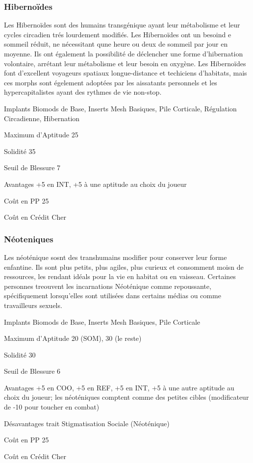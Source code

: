 \subsubsection{Hibernoïdes} \label{sec:starting-hibernoids} 

Les Hibernoïdes sont des humains transgénique ayant leur métabolisme et leur cycles circadien trés lourdement modifiés. Les Hibernoïdes ont un besoind e sommeil réduit, ne nécessitant qune heure ou deux de sommeil par jour en moyenne. Ils ont également la possibilité de déclencher une forme d'hibernation volontaire, arrétant leur métabolisme et leur besoin en oxygène. Les Hibernoïdes font d'excellent voyageurs spatiaux longue-distance et techiciens d'habitats, mais ces morphs sont égelement adoptées par les aissatants personnels et les hypercapitalistes ayant des rythmes de vie non-stop. 

\begin{description*} \item[Implants] Biomods de Base, Inserts Mesh Basiques, Pile Corticale, Régulation Circadienne, Hibernation\item[Maximum d'Aptitude] 25 \item[Solidité] 35 \item[Seuil de Blessure] 7 \item[Avantages] +5 en INT, +5 à une aptitude au choix du joueur\item[Coût en PP] 25 \item[Coût en Crédit] Cher \end{description*} 

\subsubsection{Néoteniques} \label{sec:starting-neonetics} 

Les néoténique sosnt des transhumains modifier pour conserver leur forme enfantine. Ils sont plus petits, plus agiles, plus curieux et consomment moisn de ressources, les rendant idéals pour la vie en habitat ou en vaisseau. Certaines personnes treouvent les incarnations Néoténique comme repoussante, spécifiquement lorsqu'elles sont utilisées dans certains médias ou comme travailleurs sexuels. 

\begin{description*} \item[Implants] Biomods de Base, Inserts Mesh Basiques, Pile Corticale\item[Maximum d'Aptitude] 20 (SOM), 30 (le reste) \item[Solidité] 30 \item[Seuil de Blessure] 6 \item[Avantages] +5 en COO, +5 en REF, +5 en INT, +5 à une autre aptitude au choix du joueur; les néoténiques comptent comme des petites cibles (modificateur de -10 pour toucher en combat)\item[Désavantages] trait Stigmatisation Sociale (Néoténique) \item[Coût en PP] 25 \item[Coût en Crédit] Cher \end{description*} 

